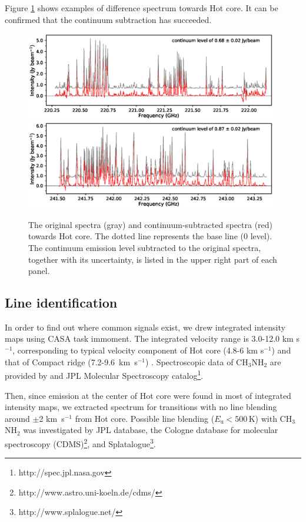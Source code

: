 Figure \ref{SVspec} shows examples of difference spectrum towards Hot core. 
It can be confirmed that the continuum subtraction has succeeded.

\begin{figure}[htbp]
  \centering
  \includegraphics[width=0.98\textwidth]{OrionKL/spec_spw2.eps}
  \includegraphics[width=0.98\textwidth]{OrionKL/spec_spw13.eps}
  \caption{The original spectra (gray) and continuum-subtracted spectra (red) towards Hot core. 
  The dotted line represents the base line (0 level). The continuum emission level subtracted to the original spectra, 
  together with its uncertainty, is listed in the upper right part of each panel.}
  \label{SVspec}
\end{figure}


\newpage
\subsection{Line identification}
In order to find out where common signals exist, we drew integrated intensity maps 
using CASA task {\sc immoment}. The integrated velocity range is 3.0-12.0 km s$^{-1}$, corresponding to
typical velocity component of Hot core (4.8-6 km s$^{-1}$) and that of Compact ridge 
(7.2-9.6~km~s$^{-1}$) \citep{Feng+2015}.
Spectroscopic data of CH$_3$NH$_2$ are provided by \citet{Motiyenko+2014} and 
JPL Molecular Spectroscopy catalog\footnote{http://spec.jpl.nasa.gov}.

Then, since emission at the center of Hot core were found in most of integrated intensity maps, 
we extracted spectrum for transitions with no line blending around $\pm$2 km~s$^{-1}$ from Hot core.
Possible line blending ($E_{\mathrm{u}} < 500\, \mathrm{K}$) with CH$_{3}$NH$_{2}$ was investigated by JPL database, 
the Cologne database for molecular spectroscopy (CDMS)\footnote{http://www.astro.uni-koeln.de/cdms/}, 
and Splatalogue\footnote{http://www.splalogue.net/}. 

